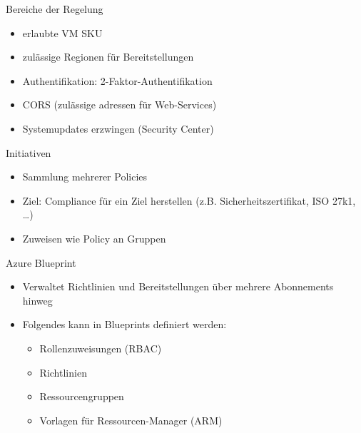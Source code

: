 \begin{flashcard}[Definition]{Bereiche der Regelung}
  \begin{itemize}
    \item erlaubte VM SKU
    \item zulässige Regionen für Bereitstellungen
    \item Authentifikation: 2-Faktor-Authentifikation
    \item CORS (zulässige adressen für Web-Services)
    \item Systemupdates erzwingen (Security Center)
  \end{itemize}
\end{flashcard}

\begin{flashcard}[Definition]{Initiativen}
  \begin{itemize}
    \item Sammlung mehrerer Policies
    \item Ziel: Compliance für ein Ziel herstellen (z.B. Sicherheitszertifikat, ISO 27k1, \ldots)
    \item Zuweisen wie Policy an Gruppen
  \end{itemize}
\end{flashcard}


\begin{flashcard}[Definition]{Azure Blueprint}
  \begin{itemize}
    \item Verwaltet Richtlinien und Bereitstellungen über mehrere Abonnements hinweg
    \item Folgendes kann in Blueprints definiert werden:
      \begin{itemize}
        \item Rollenzuweisungen (RBAC)
        \item Richtlinien
        \item Ressourcengruppen
        \item Vorlagen für Ressourcen-Manager (ARM)
      \end{itemize}
  \end{itemize}
\end{flashcard}

